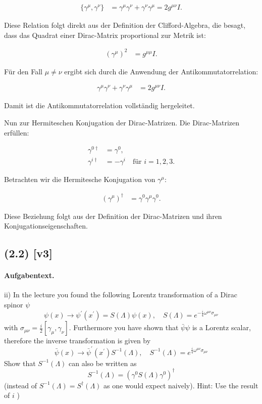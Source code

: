\documentclass[11pt,a4paper]{article}
\begin{document}
\begin{align*}
\{\gamma^\mu, \gamma^\nu\} &= \gamma^\mu \gamma^\nu + \gamma^\nu \gamma^\mu = 2 g^{\mu \nu} I.
\end{align*}

Diese Relation folgt direkt aus der Definition der Clifford-Algebra, die besagt, dass das Quadrat einer Dirac-Matrix proportional zur Metrik ist:

\begin{align*}
(\gamma^\mu)^2 &= g^{\mu \mu} I.
\end{align*}

Für den Fall \(\mu \neq \nu\) ergibt sich durch die Anwendung der Antikommutatorrelation:

\begin{align*}
\gamma^\mu \gamma^\nu + \gamma^\nu \gamma^\mu &= 2 g^{\mu \nu} I.
\end{align*}

Damit ist die Antikommutatorrelation vollständig hergeleitet.

Nun zur Hermiteschen Konjugation der Dirac-Matrizen. Die Dirac-Matrizen erfüllen:

\begin{align*}
\gamma^{0 \dagger} &= \gamma^0, \\
\gamma^{i \dagger} &= -\gamma^i \quad \text{für } i = 1, 2, 3.
\end{align*}

Betrachten wir die Hermitesche Konjugation von \(\gamma^\mu\):

\begin{align*}
(\gamma^\mu)^\dagger &= \gamma^0 \gamma^\mu \gamma^0.
\end{align*}

Diese Beziehung folgt aus der Definition der Dirac-Matrizen und ihren Konjugationseigenschaften.


\subsection*{(2.2) [v3]}
\paragraph{Aufgabentext.}
ii) In the lecture you found the following Lorentz transformation of a Dirac spinor $\psi$
$$
\psi(x) \rightarrow \psi^{\prime}\left(x^{\prime}\right)=S(\Lambda) \psi(x), \quad S(\Lambda)=e^{-\frac{i}{4} \omega^{\mu \nu} \sigma_{\mu \nu}}
$$
with $\sigma_{\mu \nu}=\frac{i}{2}\left[\gamma_\mu, \gamma_\nu\right]$.
Furthermore you have shown that $\bar{\psi} \psi$ is a Lorentz scalar, therefore the inverse transformation is given by
$$
\bar{\psi}(x) \rightarrow \bar{\psi}^{\prime}\left(x^{\prime}\right) S^{-1}(\Lambda), \quad S^{-1}(\Lambda)=e^{\frac{i}{4} \omega^{\mu \nu} \sigma_{\mu \nu}}
$$
Show that $S^{-1}(\Lambda)$ can also be written as
$$
S^{-1}(\Lambda)=\left(\gamma^0 S(\Lambda) \gamma^0\right)^{\dagger}
$$
(instead of $S^{-1}(\Lambda)=S^{\dagger}(\Lambda)$ as one would expect naively).
Hint: Use the result of $i$ )
\end{document}
